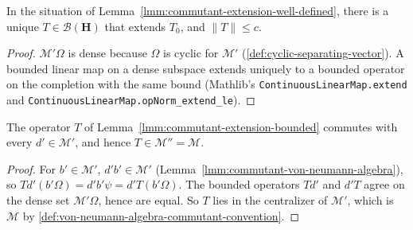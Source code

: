 \begin{lemma}
    \label{lmm:commutant-extension-bounded}
    \leanok
    In the situation of Lemma~\ref{lmm:commutant-extension-well-defined}, there is a unique $T \in \mathcal{B}(\mathbf{H})$ that extends $T_0$, and $\|T\| \le c$.
\end{lemma}
\begin{proof}
    \leanok
    $\mathcal{M}'\Omega$ is dense because $\Omega$ is cyclic for $\mathcal{M}'$ (\ref{def:cyclic-separating-vector}). A bounded linear map on a dense subspace extends uniquely to a bounded operator on the completion with the same bound (Mathlib's \texttt{ContinuousLinearMap.extend} and \texttt{ContinuousLinearMap.opNorm\_extend\_le}).
\end{proof}

\begin{lemma}
    \label{lmm:commutant-extension-in-algebra}
    \leanok
    The operator $T$ of Lemma~\ref{lmm:commutant-extension-bounded} commutes with every $d' \in \mathcal{M}'$, and hence $T \in \mathcal{M}'' = \mathcal{M}$.
\end{lemma}
\begin{proof}
    \leanok
    For $b' \in \mathcal{M}'$, $d'b' \in \mathcal{M}'$ (Lemma~\ref{lmm:commutant-von-neumann-algebra}), so $Td'(b'\Omega) = d'b'\psi = d'T(b'\Omega)$. The bounded operators $Td'$ and $d'T$ agree on the dense set $\mathcal{M}'\Omega$, hence are equal. So $T$ lies in the centralizer of $\mathcal{M}'$, which is $\mathcal{M}$ by \ref{def:von-neumann-algebra-commutant-convention}.
\end{proof}

